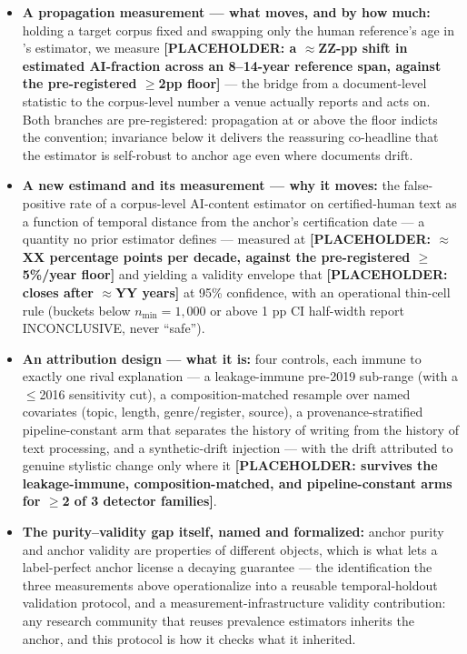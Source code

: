 \documentclass[conference]{IEEEtran}
\begin{document}
\begin{itemize}
\item \textbf{A propagation measurement --- what moves, and by how much:} holding a target corpus fixed and swapping only the human reference's age in \cite{MonitorAIScale}'s estimator, we measure \textbf{[PLACEHOLDER: a $\approx$ZZ-pp shift in estimated AI-fraction across an 8--14-year reference span, against the pre-registered $\geq$2pp floor]} --- the bridge from a document-level statistic to the corpus-level number a venue actually reports and acts on. Both branches are pre-registered: propagation at or above the floor indicts the convention; invariance below it delivers the reassuring co-headline that the estimator is self-robust to anchor age even where documents drift.
\item \textbf{A new estimand and its measurement --- why it moves:} the false-positive rate of a corpus-level AI-content estimator on certified-human text as a function of temporal distance from the anchor's certification date --- a quantity no prior estimator defines --- measured at \textbf{[PLACEHOLDER: $\approx$XX percentage points per decade, against the pre-registered $\geq$5\%/year floor]} and yielding a validity envelope that \textbf{[PLACEHOLDER: closes after $\approx$YY years]} at 95\% confidence, with an operational thin-cell rule (buckets below $n_{\min}=1{,}000$ or above 1 pp CI half-width report INCONCLUSIVE, never ``safe'').
\item \textbf{An attribution design --- what it is:} four controls, each immune to exactly one rival explanation --- a leakage-immune pre-2019 sub-range (with a $\leq$2016 sensitivity cut), a composition-matched resample over named covariates (topic, length, genre/register, source), a provenance-stratified pipeline-constant arm that separates the history of writing from the history of text processing, and a synthetic-drift injection --- with the drift attributed to genuine stylistic change only where it \textbf{[PLACEHOLDER: survives the leakage-immune, composition-matched, and pipeline-constant arms for $\geq$2 of 3 detector families]}.
\item \textbf{The purity--validity gap itself, named and formalized:} anchor purity and anchor validity are properties of different objects, which is what lets a label-perfect anchor license a decaying guarantee --- the identification the three measurements above operationalize into a reusable temporal-holdout validation protocol, and a measurement-infrastructure validity contribution: any research community that reuses prevalence estimators inherits the anchor, and this protocol is how it checks what it inherited.
\end{itemize}
\end{document}
